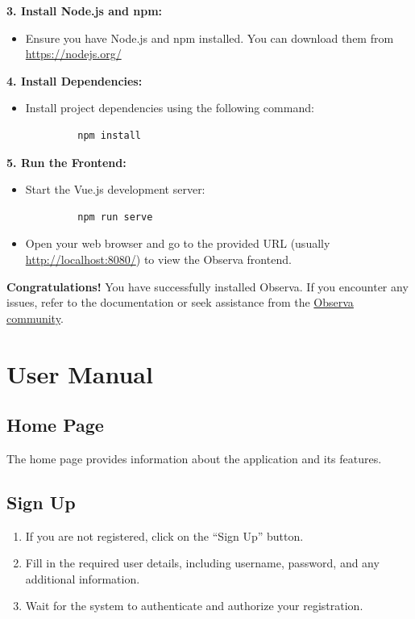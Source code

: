 \documentclass[a4 paper, 12pt]{article}
\begin{document}
\textbf{3. Install Node.js and npm:}
   \begin{itemize}
      \item Ensure you have Node.js and npm installed. You can download them from \url{https://nodejs.org/}
   \end{itemize}

\textbf{4. Install Dependencies:}
   \begin{itemize}
      \item Install project dependencies using the following command:
         \begin{verbatim}
         npm install
         \end{verbatim}
   \end{itemize}

\textbf{5. Run the Frontend:}
   \begin{itemize}
      \item Start the Vue.js development server:
         \begin{verbatim}
         npm run serve
         \end{verbatim}
      \item Open your web browser and go to the provided URL (usually \url{http://localhost:8080/}) to view the Observa frontend.
   \end{itemize}

\textbf{Congratulations!} You have successfully installed Observa. If you encounter any issues, refer to the documentation or seek assistance from the \href{https://github.com/HCI26}{Observa community}.

\section{User Manual}

\subsection{Home Page}

The home page provides information about the application and its features.

\subsection{Sign Up}

\begin{enumerate}
  \item If you are not registered, click on the ``Sign Up'' button.
  \item Fill in the required user details, including username, password, and any additional information.
  \item Wait for the system to authenticate and authorize your registration.
\end{enumerate}
\end{document}
